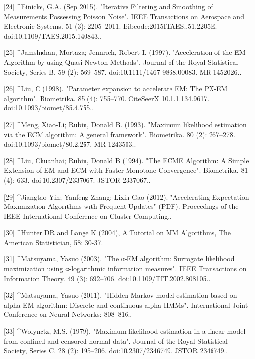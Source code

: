 [24]
^Einicke, G.A. (Sep 2015). "Iterative Filtering and Smoothing of Measurements Possessing Poisson Noise". IEEE Transactions on Aerospace and Electronic Systems. 51 (3): 2205–2011. Bibcode:2015ITAES..51.2205E. doi:10.1109/TAES.2015.140843..

[25]
^Jamshidian, Mortaza; Jennrich, Robert I. (1997). "Acceleration of the EM Algorithm by using Quasi-Newton Methods". Journal of the Royal Statistical Society, Series B. 59 (2): 569–587. doi:10.1111/1467-9868.00083. MR 1452026..

[26]
^Liu, C (1998). "Parameter expansion to accelerate EM: The PX-EM algorithm". Biometrika. 85 (4): 755–770. CiteSeerX 10.1.1.134.9617. doi:10.1093/biomet/85.4.755..

[27]
^Meng, Xiao-Li; Rubin, Donald B. (1993). "Maximum likelihood estimation via the ECM algorithm: A general framework". Biometrika. 80 (2): 267–278. doi:10.1093/biomet/80.2.267. MR 1243503..

[28]
^Liu, Chuanhai; Rubin, Donald B (1994). "The ECME Algorithm: A Simple Extension of EM and ECM with Faster Monotone Convergence". Biometrika. 81 (4): 633. doi:10.2307/2337067. JSTOR 2337067..

[29]
^Jiangtao Yin; Yanfeng Zhang; Lixin Gao (2012). "Accelerating Expectation-Maximization Algorithms with Frequent Updates" (PDF). Proceedings of the IEEE International Conference on Cluster Computing..

[30]
^Hunter DR and Lange K (2004), A Tutorial on MM Algorithms, The American Statistician, 58: 30-37.

[31]
^Matsuyama, Yasuo (2003). "The α-EM algorithm: Surrogate likelihood maximization using α-logarithmic information measures". IEEE Transactions on Information Theory. 49 (3): 692–706. doi:10.1109/TIT.2002.808105..

[32]
^Matsuyama, Yasuo (2011). "Hidden Markov model estimation based on alpha-EM algorithm: Discrete and continuous alpha-HMMs". International Joint Conference on Neural Networks: 808–816..

[33]
^Wolynetz, M.S. (1979). "Maximum likelihood estimation in a linear model from confined and censored normal data". Journal of the Royal Statistical Society, Series C. 28 (2): 195–206. doi:10.2307/2346749. JSTOR 2346749..